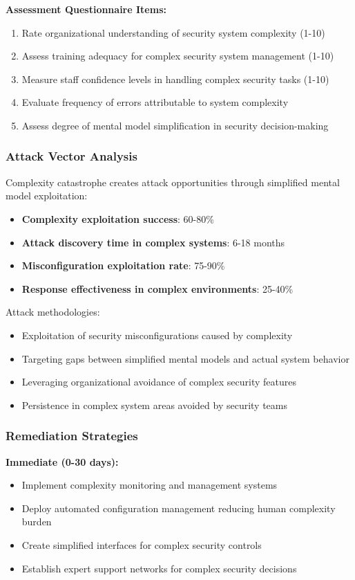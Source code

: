\documentclass[11pt,a4paper]{article}
\begin{document}
\textbf{Assessment Questionnaire Items:}
\begin{enumerate}
\item Rate organizational understanding of security system complexity (1-10)
\item Assess training adequacy for complex security system management (1-10)
\item Measure staff confidence levels in handling complex security tasks (1-10)
\item Evaluate frequency of errors attributable to system complexity
\item Assess degree of mental model simplification in security decision-making
\end{enumerate}

\subsubsection{Attack Vector Analysis}

Complexity catastrophe creates attack opportunities through simplified mental model exploitation:

\begin{itemize}
\item \textbf{Complexity exploitation success}: 60-80\%
\item \textbf{Attack discovery time in complex systems}: 6-18 months
\item \textbf{Misconfiguration exploitation rate}: 75-90\%
\item \textbf{Response effectiveness in complex environments}: 25-40\%
\end{itemize}

Attack methodologies:
\begin{itemize}
\item Exploitation of security misconfigurations caused by complexity
\item Targeting gaps between simplified mental models and actual system behavior
\item Leveraging organizational avoidance of complex security features
\item Persistence in complex system areas avoided by security teams
\end{itemize}

\subsubsection{Remediation Strategies}

\textbf{Immediate (0-30 days):}
\begin{itemize}
\item Implement complexity monitoring and management systems
\item Deploy automated configuration management reducing human complexity burden
\item Create simplified interfaces for complex security controls
\item Establish expert support networks for complex security decisions
\end{itemize}
\end{document}
